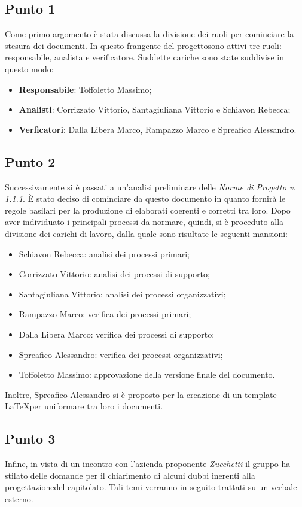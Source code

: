     \subsection{Punto 1}
        Come primo argomento è stata discussa la divisione dei ruoli per cominciare la stesura dei documenti. In questo frangente del progetto\glosp sono attivi tre ruoli: responsabile, analista e verificatore. Suddette cariche sono state suddivise in questo modo:
        \begin{itemize}
            \item \textbf{Responsabile}: Toffoletto Massimo;
            \item \textbf{Analisti}: Corrizzato Vittorio, Santagiuliana Vittorio e Schiavon Rebecca;
            \item \textbf{Verficatori}: Dalla Libera Marco, Rampazzo Marco e Spreafico Alessandro. 
        \end{itemize}
    \subsection{Punto 2}
        Successivamente si è passati a un'analisi preliminare delle \textit{Norme di Progetto v. 1.1.1}. È stato deciso di cominciare da questo documento in quanto fornirà le regole basilari per la produzione di elaborati coerenti e corretti tra loro. Dopo aver individuato i principali processi da normare, quindi, si è proceduto alla divisione dei carichi di lavoro, dalla quale sono risultate le seguenti mansioni:
        \begin{itemize}
            \item Schiavon Rebecca: analisi dei processi primari;
            \item Corrizzato Vittorio: analisi dei processi di supporto;
            \item Santagiuliana Vittorio: analisi dei processi organizzativi;
            \item Rampazzo Marco: verifica dei processi primari;
            \item Dalla Libera Marco: verifica dei processi di supporto;
            \item Spreafico Alessandro: verifica dei processi organizzativi;
            \item Toffoletto Massimo: approvazione della versione finale del documento.
        \end{itemize}
        Inoltre, Spreafico Alessandro si è proposto per la creazione di un template \LaTeX per uniformare tra loro i documenti.
    \subsection{Punto 3}
    Infine, in vista di un incontro con l'azienda proponente \textit{Zucchetti} il gruppo ha stilato delle domande per il chiarimento di alcuni dubbi inerenti alla progettazione\glosp del capitolato\glo. Tali temi verranno in seguito trattati su un verbale esterno.